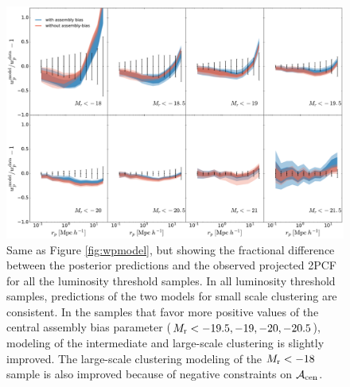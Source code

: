 \documentclass[12pt, preprint]{aastex}
\newcommand{\acen}{\mathcal{A}_{\rm cen}}
\begin{document}
\begin{figure}[p]~\\
\begin{center}
\includegraphics[width=\textwidth]{wpres.pdf}
\caption{Same as Figure \ref{fig:wpmodel}, but showing the fractional difference between the posterior predictions and the observed projected 2PCF for all the luminosity threshold samples. In all luminosity threshold samples, predictions of the two models for small scale clustering are consistent. In the samples that favor more positive values of the central assembly bias parameter ($M_{\rm r}<-19.5,-19,-20,-20.5$), modeling of the intermediate and large-scale clustering is slightly improved. The large-scale clustering modeling of the $M_{\rm r}<-18$ sample is also improved because of negative constraints on $\acen$.}
\label{fig:wpres}
\end{center}
\end{figure}

\clearpage
\end{document}
